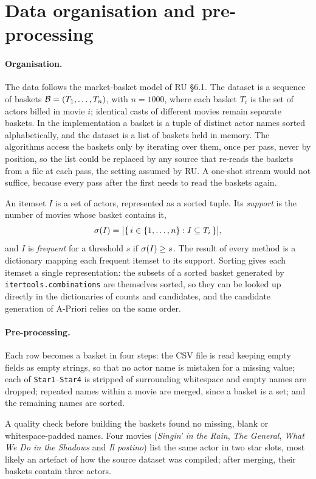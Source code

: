 \section{Data organisation and pre-processing}
\label{sec:preprocessing}

\paragraph{Organisation.} The data follows the market-basket model of RU \S6.1. The dataset is a sequence of baskets $\mathcal{B} = (T_1, \dots, T_n)$, with $n = 1000$, where each basket $T_i$ is the set of actors billed in movie $i$; identical casts of different movies remain separate baskets. In the implementation a basket is a tuple of distinct actor names sorted alphabetically, and the dataset is a list of baskets held in memory. The algorithms access the baskets only by iterating over them, once per pass, never by position, so the list could be replaced by any source that re-reads the baskets from a file at each pass, the setting assumed by RU. A one-shot stream would not suffice, because every pass after the first needs to read the baskets again.

An itemset $I$ is a set of actors, represented as a sorted tuple. Its \emph{support} is the number of movies whose basket contains it,
\[
  \sigma(I) = \bigl|\{\, i \in \{1, \dots, n\} : I \subseteq T_i \,\}\bigr|,
\]
and $I$ is \emph{frequent} for a threshold $s$ if $\sigma(I) \ge s$. The result of every method is a dictionary mapping each frequent itemset to its support. Sorting gives each itemset a single representation: the subsets of a sorted basket generated by \texttt{itertools.combinations} are themselves sorted, so they can be looked up directly in the dictionaries of counts and candidates, and the candidate generation of A-Priori relies on the same order.

\paragraph{Pre-processing.} Each row becomes a basket in four steps: the CSV file is read keeping empty fields as empty strings, so that no actor name is mistaken for a missing value; each of \texttt{Star1}--\texttt{Star4} is stripped of surrounding whitespace and empty names are dropped; repeated names within a movie are merged, since a basket is a set; and the remaining names are sorted.

A quality check before building the baskets found no missing, blank or whitespace-padded names. Four movies (\emph{Singin' in the Rain}, \emph{The General}, \emph{What We Do in the Shadows} and \emph{Il postino}) list the same actor in two star slots, most likely an artefact of how the source dataset was compiled; after merging, their baskets contain three actors.

